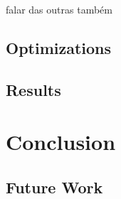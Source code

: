 \documentclass{report}
\begin{document}
	\par falar das outras também
	
	\section{Optimizations}
	
	\section{Results}
	



\chapter{Conclusion}

	\section{Future Work} 

\newpage
	
{}

	
\end{document}
